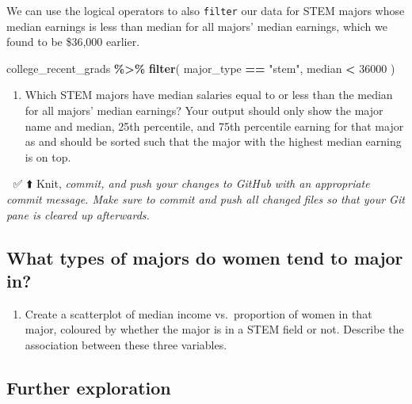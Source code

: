 \documentclass[
]{article}
\newenvironment{Shaded}{\begin{snugshade}}{\end{snugshade}}
\newcommand{\DecValTok}[1]{\textcolor[rgb]{0.00,0.00,0.81}{#1}}
\newcommand{\FunctionTok}[1]{\textcolor[rgb]{0.13,0.29,0.53}{\textbf{#1}}}
\newcommand{\NormalTok}[1]{#1}
\newcommand{\SpecialCharTok}[1]{\textcolor[rgb]{0.81,0.36,0.00}{\textbf{#1}}}
\newcommand{\StringTok}[1]{\textcolor[rgb]{0.31,0.60,0.02}{#1}}
\providecommand{\tightlist}{%
  \setlength{\itemsep}{0pt}\setlength{\parskip}{0pt}}
\begin{document}
We can use the logical operators to also \texttt{filter} our data for
STEM majors whose median earnings is less than median for all majors'
median earnings, which we found to be \$36,000 earlier.

\begin{Shaded}
\begin{Highlighting}[]
\NormalTok{college\_recent\_grads }\SpecialCharTok{\%\textgreater{}\%}
  \FunctionTok{filter}\NormalTok{(}
\NormalTok{    major\_type }\SpecialCharTok{==} \StringTok{"stem"}\NormalTok{,}
\NormalTok{    median }\SpecialCharTok{\textless{}} \DecValTok{36000}
\NormalTok{  )}
\end{Highlighting}
\end{Shaded}

\begin{enumerate}
\def\labelenumi{\arabic{enumi}.}
\setcounter{enumi}{7}
\tightlist
\item
  Which STEM majors have median salaries equal to or less than the
  median for all majors' median earnings? Your output should only show
  the major name and median, 25th percentile, and 75th percentile
  earning for that major as and should be sorted such that the major
  with the highest median earning is on top.
\end{enumerate}

🧶 ✅ ⬆️ Knit, \emph{commit, and push your changes to GitHub with an
appropriate commit message. Make sure to commit and push all changed
files so that your Git pane is cleared up afterwards.}

\subsection{What types of majors do women tend to major
in?}\label{what-types-of-majors-do-women-tend-to-major-in}

\begin{enumerate}
\def\labelenumi{\arabic{enumi}.}
\setcounter{enumi}{8}
\tightlist
\item
  Create a scatterplot of median income vs.~proportion of women in that
  major, coloured by whether the major is in a STEM field or not.
  Describe the association between these three variables.
\end{enumerate}

\subsection{Further exploration}\label{further-exploration}
\end{document}
